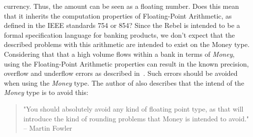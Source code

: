 currency. Thus, the amount can be seen as a floating number. Does this mean that
it inherits the computation properties of Floating-Point Arithmetic, as defined
in the IEEE standards 754 or 854? Since the Rebel is intended to be a formal
specification language for banking products, we don't expect that the described
problems with this arithmetic are intended to exist on the Money type.
Considering that that a high volume flows within a bank in terms of
\textit{Money}, using the Floating-Point Arithmetic properties can result in the
known precision, overflow and underflow errors as described
in~\cite{goldberg1991every}. Such errors should be avoided when using the
\textit{Money} type. The author of \cite{fowler2002patterns} also describes that
the intend of the \textit{Money} type is to avoid this:
\begin{quote}
	"You should absolutely avoid any kind of floating point type, as that will
	introduce the kind of rounding problems that Money is intended to avoid."
    -- Martin Fowler \cite{fowler2002patterns}
\end{quote}

